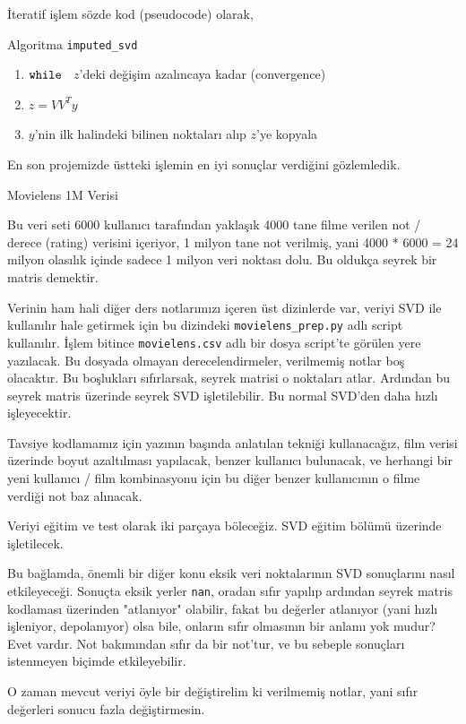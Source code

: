 \documentclass[12pt,fleqn]{article}\usepackage{../../common}
\begin{document}
İteratif işlem sözde kod (pseudocode) olarak,

Algoritma \verb!imputed_svd!
\begin{enumerate}
  \item $\mbox{\texttt{while }}$ $z$'deki değişim azalıncaya kadar (convergence)
  \item $z = VV^Ty$ 
  \item  $y$'nin ilk halindeki bilinen noktaları alıp $z$'ye kopyala
\end{enumerate}

En son projemizde üstteki işlemin en iyi sonuçlar verdiğini gözlemledik. 

Movielens 1M Verisi

Bu veri seti 6000 kullanıcı tarafından yaklaşık 4000 tane filme
verilen not / derece (rating) verisini içeriyor, 1 milyon tane not
verilmiş, yani 4000 * 6000 = 24 milyon olasılık içinde sadece 1 milyon
veri noktası dolu. Bu oldukça seyrek bir matris demektir.

Verinin ham hali diğer ders notlarımızı içeren üst dizinlerde var, veriyi
SVD ile kullanılır hale getirmek için bu dizindeki \verb!movielens_prep.py!
adlı script kullanılır. İşlem bitince \verb!movielens.csv! adlı bir dosya
script'te görülen yere yazılacak. Bu dosyada olmayan derecelendirmeler,
verilmemiş notlar boş olacaktır. Bu boşlukları sıfırlarsak, seyrek matrisi
o noktaları atlar. Ardından bu seyrek matris üzerinde seyrek SVD
işletilebilir. Bu normal SVD'den daha hızlı işleyecektir.

Tavsiye kodlamamız için yazının başında anlatılan tekniği kullanacağız, film
verisi üzerinde boyut azaltılması yapılacak, benzer kullanıcı bulunacak, ve
herhangi bir yeni kullanıcı / film kombinasyonu için bu diğer benzer
kullanıcının o filme verdiği not baz alınacak.

Veriyi eğitim ve test olarak iki parçaya böleceğiz. SVD eğitim bölümü
üzerinde işletilecek.

Bu bağlamda, önemli bir diğer konu eksik veri noktalarının SVD
sonuçlarını nasıl etkileyeceği. Sonuçta eksik yerler \verb!nan!,
oradan sıfır yapılıp ardından seyrek matris kodlaması üzerinden
"atlanıyor" olabilir, fakat bu değerler atlanıyor (yani hızlı
işleniyor, depolanıyor) olsa bile, onların sıfır olmasının bir anlamı
yok mudur? Evet vardır. Not bakımından sıfır da bir not'tur, ve bu
sebeple sonuçları istenmeyen biçimde etkileyebilir.

O zaman mevcut veriyi öyle bir değiştirelim ki verilmemiş notlar, yani
sıfır değerleri sonucu fazla değiştirmesin.
\end{document}
